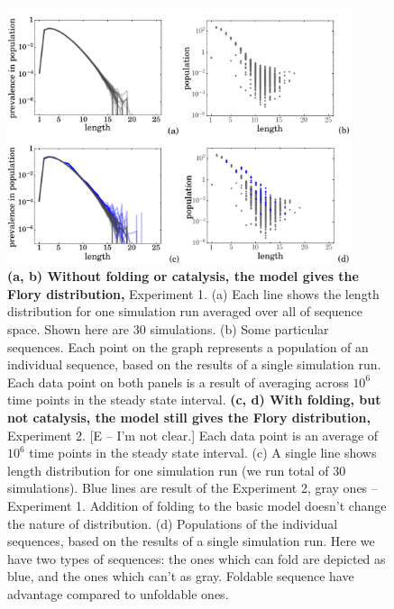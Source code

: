 \documentclass[5p,times]{elsarticle}
\begin{document}
\begin{figure}[h!]
  \centering
  \includegraphics[width=0.9\textwidth]{pictures/distr-many-not-good.pdf}
  \caption{\footnotesize{
\textbf{(a, b) Without folding or catalysis, the model gives the Flory distribution,} Experiment 1. 
 (a) Each line shows the length distribution for one simulation run averaged over all of sequence 
space.  Shown here are 30 simulations.
 (b) Some particular sequences. Each point on the graph represents a population of an
individual sequence, based on the results of a single simulation run. Each data point on both 
panels is a result of averaging across $10^6$ time points in the steady state interval.   
    \textbf{(c, d) With folding, but not catalysis, the model still gives the Flory distribution,} 
Experiment 2.  
    [E -- I'm not clear.]  Each data point is an 
average of $10^6$ time points in the steady state interval. (c) 
A single line shows length distribution for one simulation run (we run total of 30 simulations). 
Blue lines are result of the Experiment 2, gray ones -- Experiment 1. Addition of folding to the 
basic model doesn't change the nature of distribution. (d) Populations of the individual 
sequences, 
based on the results of a single simulation run. Here we have two types of sequences: the ones 
which can fold are depicted as blue, and the ones which can't as gray. Foldable sequence have 
advantage compared 
to unfoldable ones.}}
  \label{fig:sim.flory-fold}
\end{figure}
\end{document}
